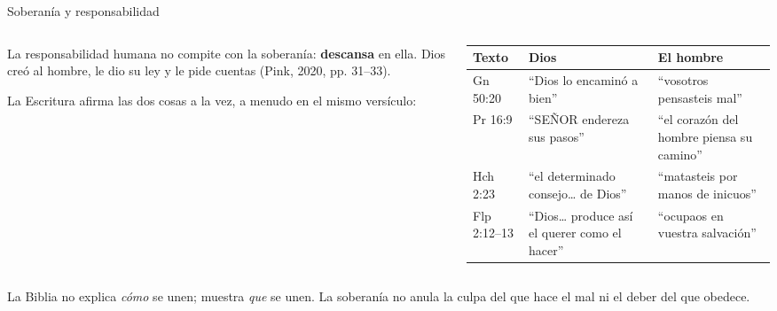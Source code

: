 \documentclass[hyperref={bookmarks=false},aspectratio=169]{beamer}
\newcommand{\SENOR}{S{\fontsize{0.78em}{1em}\selectfont EÑOR}}
\newcommand{\destacar}[1]{\textbf{\textcolor{azul}{#1}}}
\begin{document}
\begin{frame}{Soberanía y responsabilidad}
\begin{columns}[t,onlytextwidth]
\begin{column}{0.48\textwidth}\small
La responsabilidad humana no compite con la soberanía: \destacar{descansa} en ella. Dios creó al hombre, le dio su ley y le pide cuentas (Pink, 2020, pp. 31--33).\par\medskip
La Escritura afirma las dos cosas a la vez, a menudo en el mismo versículo:
\end{column}
\begin{column}{0.50\textwidth}
\scriptsize\renewcommand{\arraystretch}{1.15}
\begin{tabular}{@{}>{\RaggedRight\arraybackslash}p{1.4cm}>{\RaggedRight\arraybackslash}p{2.3cm}>{\RaggedRight\arraybackslash}p{2.3cm}@{}}
\toprule
\textbf{Texto} & \textbf{Dios} & \textbf{El hombre} \\ \midrule
Gn 50:20 & ``Dios lo encaminó a bien'' & ``vosotros pensasteis mal'' \\
Pr 16:9 & ``\SENOR{} endereza sus pasos'' & ``el corazón del hombre piensa su camino'' \\
Hch 2:23 & ``el determinado consejo\ldots{} de Dios'' & ``matasteis por manos de inicuos'' \\
Flp 2:12--13 & ``Dios\ldots{} produce así el querer como el hacer'' & ``ocupaos en vuestra salvación'' \\
\bottomrule
\end{tabular}
\end{column}
\end{columns}\par\medskip
\begin{tcolorbox}[colback=papiro,colframe=azul,boxrule=1pt,arc=3pt]
\small La Biblia no explica \emph{cómo} se unen; muestra \emph{que} se unen. La soberanía no anula la culpa del que hace el mal ni el deber del que obedece.
\end{tcolorbox}
\end{frame}
\end{document}

